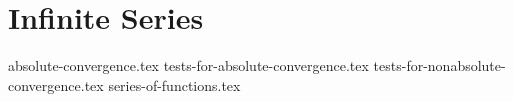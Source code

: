 \chapter{Infinite Series}
{absolute-convergence.tex}
{tests-for-absolute-convergence.tex}
{tests-for-nonabsolute-convergence.tex}
{series-of-functions.tex}

